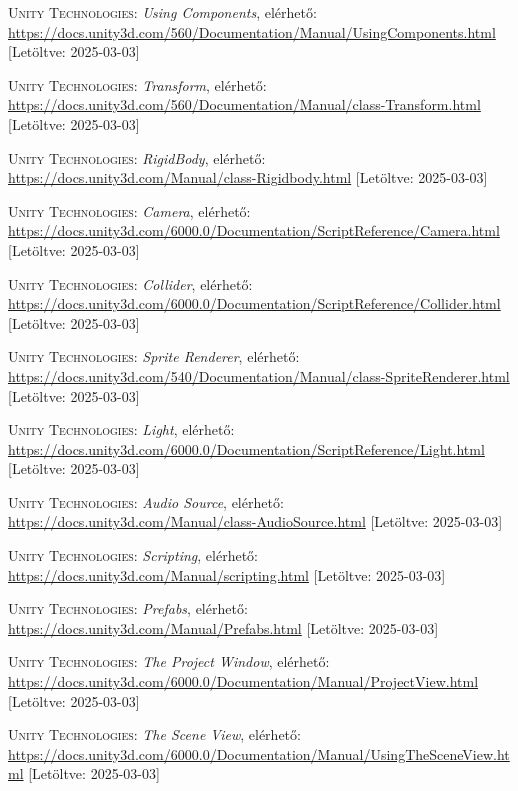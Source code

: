 \documentclass[]{thesis-ekf}
\theoremstyle{definition}
\theoremstyle{remark}
\begin{document}
\begin{thebibliography}{2}
	\textsc{Unity Technologies}: \emph{Using Components}, elérhető:
	\url{https://docs.unity3d.com/560/Documentation/Manual/UsingComponents.html} [Letöltve: 2025-03-03]
	
	\textsc{Unity Technologies}: \emph{Transform}, elérhető:
	\url{https://docs.unity3d.com/560/Documentation/Manual/class-Transform.html} [Letöltve: 2025-03-03]
	
	\textsc{Unity Technologies}: \emph{RigidBody}, elérhető:
	\url{https://docs.unity3d.com/Manual/class-Rigidbody.html} [Letöltve: 2025-03-03]
	
	\textsc{Unity Technologies}: \emph{Camera}, elérhető:
	\url{https://docs.unity3d.com/6000.0/Documentation/ScriptReference/Camera.html} [Letöltve: 2025-03-03]
	
	\textsc{Unity Technologies}: \emph{Collider}, elérhető:
	\url{https://docs.unity3d.com/6000.0/Documentation/ScriptReference/Collider.html} [Letöltve: 2025-03-03]
	
	\textsc{Unity Technologies}: \emph{Sprite Renderer}, elérhető:
	\url{https://docs.unity3d.com/540/Documentation/Manual/class-SpriteRenderer.html} [Letöltve: 2025-03-03]
	
	\textsc{Unity Technologies}: \emph{Light}, elérhető:
	\url{https://docs.unity3d.com/6000.0/Documentation/ScriptReference/Light.html} [Letöltve: 2025-03-03]
	
	\textsc{Unity Technologies}: \emph{Audio Source}, elérhető:
	\url{https://docs.unity3d.com/Manual/class-AudioSource.html} [Letöltve: 2025-03-03]
	
	\textsc{Unity Technologies}: \emph{Scripting}, elérhető:
	\url{https://docs.unity3d.com/Manual/scripting.html} [Letöltve: 2025-03-03]
	
	\textsc{Unity Technologies}: \emph{Prefabs}, elérhető:
	\url{https://docs.unity3d.com/Manual/Prefabs.html} [Letöltve: 2025-03-03]
	
	\textsc{Unity Technologies}: \emph{The Project Window}, elérhető:
	\url{https://docs.unity3d.com/6000.0/Documentation/Manual/ProjectView.html} [Letöltve: 2025-03-03]
	
	\textsc{Unity Technologies}: \emph{The Scene View}, elérhető:
	\url{https://docs.unity3d.com/6000.0/Documentation/Manual/UsingTheSceneView.html} [Letöltve: 2025-03-03]
	

\end{thebibliography}
\end{document}
